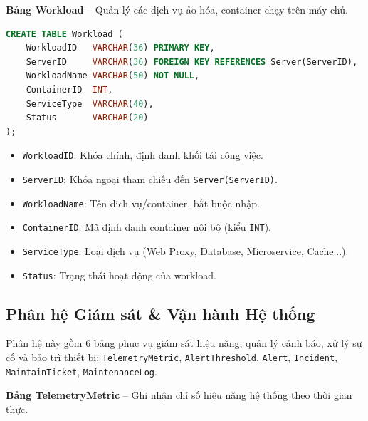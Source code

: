 \vspace{0.5em}
\noindent\textbf{Bảng Workload} -- Quản lý các dịch vụ ảo hóa, container chạy trên máy chủ.

\begin{tcolorbox}[colback=gray!5, colframe=gray!60, title={\textbf{CREATE TABLE Workload}}, fonttitle=\bfseries\small, boxrule=0.5pt, arc=2pt]
\begin{lstlisting}[language=SQL, basicstyle=\ttfamily\small, breaklines=true, showstringspaces=false, keywordstyle=\bfseries\color{blue!70!black}, stringstyle=\color{red!70!black}, commentstyle=\itshape\color{green!50!black}]
CREATE TABLE Workload (
    WorkloadID   VARCHAR(36) PRIMARY KEY,
    ServerID     VARCHAR(36) FOREIGN KEY REFERENCES Server(ServerID),
    WorkloadName VARCHAR(50) NOT NULL,
    ContainerID  INT,
    ServiceType  VARCHAR(40),
    Status       VARCHAR(20)
);
\end{lstlisting}
\end{tcolorbox}

\begin{itemize}[leftmargin=2em]
    \item \texttt{WorkloadID}: Khóa chính, định danh khối tải công việc.
    \item \texttt{ServerID}: Khóa ngoại tham chiếu đến \texttt{Server(ServerID)}.
    \item \texttt{WorkloadName}: Tên dịch vụ/container, bắt buộc nhập.
    \item \texttt{ContainerID}: Mã định danh container nội bộ (kiểu \texttt{INT}).
    \item \texttt{ServiceType}: Loại dịch vụ (Web Proxy, Database, Microservice, Cache...).
    \item \texttt{Status}: Trạng thái hoạt động của workload.
\end{itemize}

\subsection{Phân hệ Giám sát \& Vận hành Hệ thống}

Phân hệ này gồm 6 bảng phục vụ giám sát hiệu năng, quản lý cảnh báo, xử lý sự cố và bảo trì thiết bị: \texttt{TelemetryMetric}, \texttt{AlertThreshold}, \texttt{Alert}, \texttt{Incident}, \texttt{MaintainTicket}, \texttt{MaintenanceLog}.

\vspace{0.5em}
\noindent\textbf{Bảng TelemetryMetric} -- Ghi nhận chỉ số hiệu năng hệ thống theo thời gian thực.

